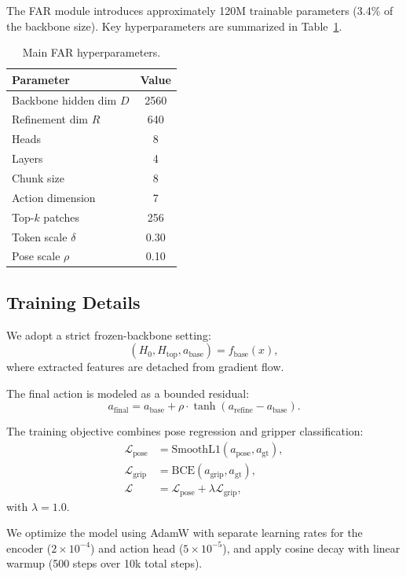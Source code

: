 \documentclass[conference]{IEEEtran}
\begin{document}
The FAR module introduces approximately 120M trainable parameters (3.4\% of the backbone size). Key hyperparameters are summarized in Table~\ref{tab:hyper}.

\begin{table}[t]
\centering
\caption{Main FAR hyperparameters.}
\label{tab:hyper}
\begin{tabular}{lc}
\toprule
Parameter & Value \\
\midrule
Backbone hidden dim $D$ & 2560 \\
Refinement dim $R$ & 640 \\
Heads & 8 \\
Layers & 4 \\
Chunk size & 8 \\
Action dimension & 7 \\
Top-$k$ patches & 256 \\
Token scale $\delta$ & 0.30 \\
Pose scale $\rho$ & 0.10 \\
\bottomrule
\end{tabular}
\end{table}

\subsection{Training Details}
We adopt a strict frozen-backbone setting:
\begin{equation}
(H_0, H_{\text{top}}, a_{\text{base}}) = f_{\text{base}}(x),
\end{equation}
where extracted features are detached from gradient flow.

The final action is modeled as a bounded residual:
\begin{equation}
a_{\text{final}} = a_{\text{base}} + \rho \cdot \tanh(a_{\text{refine}} - a_{\text{base}}).
\end{equation}

The training objective combines pose regression and gripper classification:
\begin{align}
\mathcal{L}_{\text{pose}} &= \text{SmoothL1}(a_{\text{pose}}, a_{\text{gt}}), \\
\mathcal{L}_{\text{grip}} &= \text{BCE}(a_{\text{grip}}, a_{\text{gt}}), \\
\mathcal{L} &= \mathcal{L}_{\text{pose}} + \lambda \mathcal{L}_{\text{grip}},
\end{align}
with $\lambda = 1.0$.

We optimize the model using AdamW with separate learning rates for the encoder ($2\times10^{-4}$) and action head ($5\times10^{-5}$), and apply cosine decay with linear warmup (500 steps over 10k total steps).
\end{document}
